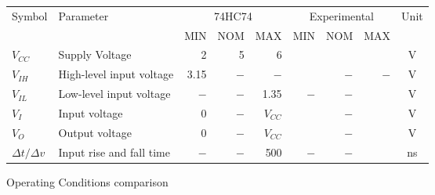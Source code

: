 \begin{tabular}{|l|l|r|r|r|r|r|r|c|}
    \toprule
    Symbol  &Parameter  &\multicolumn{3}{|c|}{74HC74}&\multicolumn{3}{|c|}{Experimental}&Unit\\
            &           &   MIN&NOM&MAX&MIN&NOM&MAX&\\
    \midrule
    $V_{CC}$&Supply Voltage&2&5&6&  &  &  &V\\
    $V_{IH}$&High-level input voltage&3.15&$-$&$-$&   &$-$&$-$&V\\
    $V_{IL}$&Low-level input voltage&$-$&$-$&1.35&$-$&$-$&  &V\\
    $V_{I}$ &Input voltage&0&$-$&$V_{CC}$&  &$-$&   &V\\
    $V_{O}$ &Output voltage&0&$-$&$V_{CC}$&  &$-$&   &V\\
    $\Delta t / \Delta v$&  Input rise and fall time&$-$&$-$&500&$-$&$-$&   &ns\\
    \bottomrule
\end{tabular}
\caption{Operating Conditions comparison}